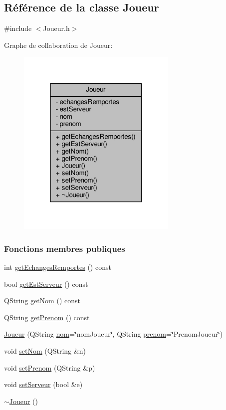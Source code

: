 \hypertarget{class_joueur}{}\subsection{Référence de la classe Joueur}
\label{class_joueur}


{\ttfamily \#include $<$Joueur.\+h$>$}



Graphe de collaboration de Joueur\+:
\nopagebreak
\begin{figure}[H]
\begin{center}
\leavevmode
\includegraphics[width=217pt]{class_joueur__coll__graph}
\end{center}
\end{figure}
\subsubsection*{Fonctions membres publiques}
\begin{DoxyCompactItemize}
\item 
int \hyperlink{class_joueur_affde221fc6d6bf633991fff4f11dd62b}{get\+Echanges\+Remportes} () const
\item 
bool \hyperlink{class_joueur_a7bf0e45b6600ae3a68b4afdad6d884b7}{get\+Est\+Serveur} () const
\item 
Q\+String \hyperlink{class_joueur_a1d7082ab1f926eae1bd6834e901751a7}{get\+Nom} () const
\item 
Q\+String \hyperlink{class_joueur_ade527085b285ce86ea9e369bc9959032}{get\+Prenom} () const
\item 
\hyperlink{class_joueur_a75f73a73741b0faa59c75fc98b872765}{Joueur} (Q\+String \hyperlink{class_joueur_ab06d7f1e6b482299bb03919e0cd2166d}{nom}=\char`\"{}nom\+Joueur\char`\"{}, Q\+String \hyperlink{class_joueur_a96d4237143c2e57b8025c4e116e95909}{prenom}=\char`\"{}Prenom\+Joueur\char`\"{})
\item 
void \hyperlink{class_joueur_a30fdb194cbf6d7c378d173cc133fc23e}{set\+Nom} (Q\+String \&n)
\item 
void \hyperlink{class_joueur_a1425ea57a1f030a26d9beb1244e6caa2}{set\+Prenom} (Q\+String \&p)
\item 
void \hyperlink{class_joueur_aea42f5af160c61130d5252796378ad4f}{set\+Serveur} (bool \&e)
\item 
\hyperlink{class_joueur_a9fb594f755601ee77ce5884c4c0861f3}{$\sim$\+Joueur} ()
\end{DoxyCompactItemize}
